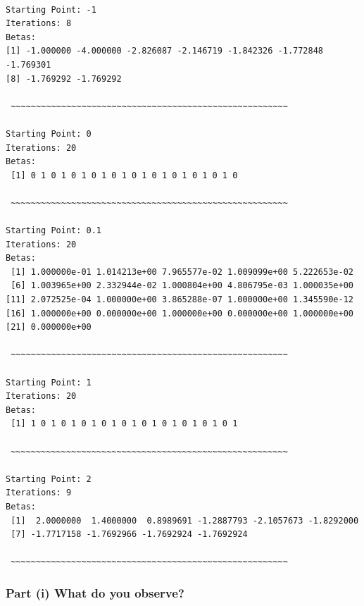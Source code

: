 \documentclass[
  letterpaper,
  DIV=11,
  numbers=noendperiod]{scrartcl}
\begin{document}
\begin{verbatim}

Starting Point: -1 
Iterations: 8 
Betas:
[1] -1.000000 -4.000000 -2.826087 -2.146719 -1.842326 -1.772848 -1.769301
[8] -1.769292 -1.769292

 ~~~~~~~~~~~~~~~~~~~~~~~~~~~~~~~~~~~~~~~~~~~~~~~~~~~~~~~ 

Starting Point: 0 
Iterations: 20 
Betas:
 [1] 0 1 0 1 0 1 0 1 0 1 0 1 0 1 0 1 0 1 0 1 0

 ~~~~~~~~~~~~~~~~~~~~~~~~~~~~~~~~~~~~~~~~~~~~~~~~~~~~~~~ 

Starting Point: 0.1 
Iterations: 20 
Betas:
 [1] 1.000000e-01 1.014213e+00 7.965577e-02 1.009099e+00 5.222653e-02
 [6] 1.003965e+00 2.332944e-02 1.000804e+00 4.806795e-03 1.000035e+00
[11] 2.072525e-04 1.000000e+00 3.865288e-07 1.000000e+00 1.345590e-12
[16] 1.000000e+00 0.000000e+00 1.000000e+00 0.000000e+00 1.000000e+00
[21] 0.000000e+00

 ~~~~~~~~~~~~~~~~~~~~~~~~~~~~~~~~~~~~~~~~~~~~~~~~~~~~~~~ 

Starting Point: 1 
Iterations: 20 
Betas:
 [1] 1 0 1 0 1 0 1 0 1 0 1 0 1 0 1 0 1 0 1 0 1

 ~~~~~~~~~~~~~~~~~~~~~~~~~~~~~~~~~~~~~~~~~~~~~~~~~~~~~~~ 

Starting Point: 2 
Iterations: 9 
Betas:
 [1]  2.0000000  1.4000000  0.8989691 -1.2887793 -2.1057673 -1.8292000
 [7] -1.7717158 -1.7692966 -1.7692924 -1.7692924

 ~~~~~~~~~~~~~~~~~~~~~~~~~~~~~~~~~~~~~~~~~~~~~~~~~~~~~~~ 
\end{verbatim}

\subsubsection{Part (i) What do you
observe?}\label{part-i-what-do-you-observe}
\end{document}
